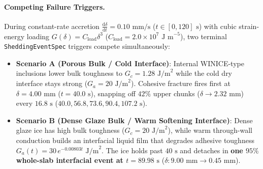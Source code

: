 \documentclass[11pt,a4paper]{article}
\newcommand{\dd}{\mathrm{d}}
\newcommand{\td}[2]{\frac{\dd #1}{\dd #2}}
\begin{document}
\paragraph{Competing Failure Triggers.}
During constant-rate accretion $\td{\delta}{t} = 0.10\text{ mm/s}$ ($t \in [0, 120]\text{ s}$) with cubic strain-energy loading $G(\delta) = C_{\text{load}}\delta^3$ ($C_{\text{load}} = 2.0\times 10^7\text{ J m}^{-5}$), two terminal \texttt{SheddingEventSpec} triggers compete simultaneously:
\begin{itemize}[leftmargin=1.5em,itemsep=2pt]
  \item \textbf{Scenario A (Porous Bulk / Cold Interface)}: Internal WINICE-type inclusions lower bulk toughness to $G_c = 1.28\text{ J/m}^2$ while the cold dry interface stays strong ($G_a = 20\text{ J/m}^2$). Cohesive fracture fires first at $\delta = 4.00\text{ mm}$ ($t = 40.0\text{ s}$), snapping off $42\%$ upper chunks ($\delta \to 2.32\text{ mm}$) every $16.8\text{ s}$ ($40.0, 56.8, 73.6, 90.4, 107.2\text{ s}$).
  \item \textbf{Scenario B (Dense Glaze Bulk / Warm Softening Interface)}: Dense glaze ice has high bulk toughness ($G_c = 20\text{ J/m}^2$), while warm through-wall conduction builds an interfacial liquid film that degrades adhesive toughness $G_a(t) = 30\,e^{-0.00803 t}\text{ J/m}^2$. The ice holds past $40\text{ s}$ and detaches in \textbf{one $95\%$ whole-slab interfacial event at $t = 89.98\text{ s}$} ($\delta: 9.00\text{ mm} \to 0.45\text{ mm}$).
\end{itemize}
\end{document}
